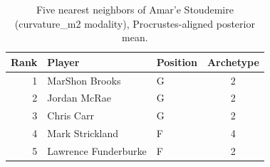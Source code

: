 \begin{table}[htbp]
  \centering\small
  \begin{tabular}{rllc}
    \toprule
    Rank & Player & Position & Archetype \\
    \midrule
    1 & MarShon Brooks & G & 2 \\
    2 & Jordan McRae & G & 2 \\
    3 & Chris Carr & G & 2 \\
    4 & Mark Strickland & F & 4 \\
    5 & Lawrence Funderburke & F & 2 \\
    \bottomrule
  \end{tabular}
  \caption{Five nearest neighbors of Amar'e Stoudemire (curvature_m2 modality), Procrustes-aligned posterior mean.}
  \label{tab:Amar_e_Stoudemire_neighbors_curvature_m2}
\end{table}

